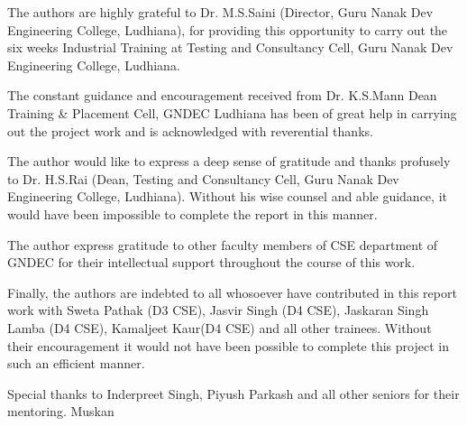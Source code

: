 \begin{Large}
\end{Large}
The authors are highly grateful to Dr. M.S.Saini (Director, Guru
Nanak Dev Engineering College, Ludhiana), for providing this
opportunity to carry out the six weeks Industrial Training at Testing
and Consultancy Cell, Guru Nanak Dev Engineering College, Ludhiana.

The constant guidance and encouragement received from Dr. K.S.Mann
Dean Training \& Placement Cell, GNDEC Ludhiana has been of great help in carrying out the
project work and is acknowledged with reverential thanks.

The author would like to express a deep sense of gratitude and thanks
profusely to Dr. H.S.Rai (Dean, Testing and Consultancy Cell, Guru
Nanak Dev Engineering College, Ludhiana). Without his wise counsel and
able guidance, it would have been impossible to complete the report in
this manner.

The author express gratitude to other faculty members of CSE department 
of GNDEC for their intellectual support
throughout the course of this work.

Finally, the authors are indebted to all whosoever have contributed in
this report work with Sweta Pathak (D3 CSE), Jasvir Singh (D4 CSE), 
Jaskaran Singh Lamba (D4 CSE), Kamaljeet Kaur(D4 CSE) and all other trainees. Without their 
encouragement it would not have been possible to complete this project
in such an efficient manner.

Special thanks to Inderpreet Singh, Piyush Parkash
and all other seniors for their mentoring.
\vskip 1.0cm 
\noindent Muskan


